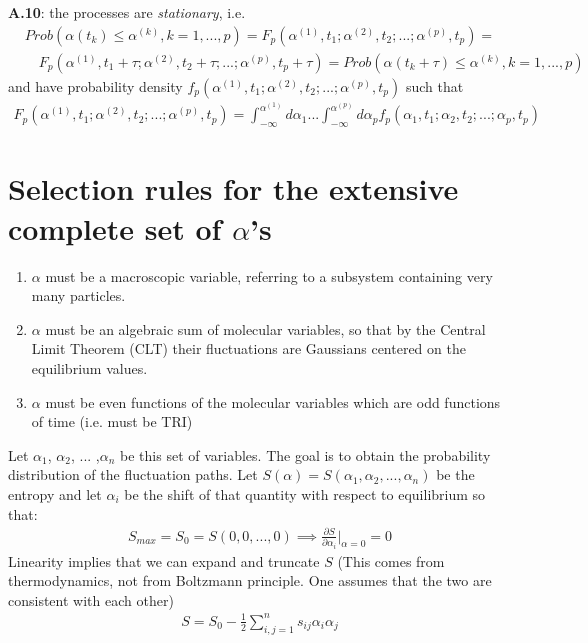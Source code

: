 \documentclass{article}
\begin{document}
\newline 
\textbf{A.10}: the processes are \textit{stationary}, i.e. 
\begin{align*}
&Prob(\alpha(t_k) \leq \alpha^{(k)}, k=1, ... , p) = F_p(\alpha^{(1)}, t_1 ;\alpha^{(2)}, t_2; ... ; \alpha^{(p)}, t_p) = \\&\quad
F_p(\alpha^{(1)}, t_1+ \tau ;\alpha^{(2)}, t_2+ \tau; ... ; \alpha^{(p)}, t_p + \tau) = Prob(\alpha(t_k + \tau) \leq \alpha^{(k)}, k=1, ... , p) 
\end{align*}
and have probability density $f_p(\alpha^{(1)}, t_1 ; \alpha^{(2)}, t_2; ... ; \alpha^{(p)}, t_p)$ such that
\begin{align*}
F_p(\alpha^{(1)}, t_1 ;\alpha^{(2)}, t_2; ... ; \alpha^{(p)}, t_p) = \int_{-\infty}^{\alpha^{(1)}}d\alpha_1 ...\int_{-\infty}^{\alpha^{(p)}}d\alpha_p f_p(\alpha_1, t_1 ; \alpha_2, t_2; ... ; \alpha_p, t_p)
\end{align*}

\section{Selection rules for the extensive complete set of $\alpha$'s}
 \begin{enumerate} 
 \item $\alpha$ must be a macroscopic variable, referring to a subsystem containing very many particles.
 \item $\alpha$ must be an algebraic sum of molecular variables, so that by the Central Limit Theorem (CLT) their fluctuations are Gaussians centered on the equilibrium values. 
 \item $\alpha$ must be even functions of the molecular variables which are odd functions of time (i.e. must be TRI)
 \end{enumerate}
Let $\alpha_1$, $\alpha_2$, ... ,$\alpha_n$ be this set of variables. The goal is to obtain the probability distribution of the fluctuation paths. 
Let $S(\alpha) = S(\alpha_1, \alpha_2, ... , \alpha_n)$ be the entropy and let $\alpha_i$ be the shift of that quantity with respect to equilibrium so that:
\begin{align*}
S_{max} = S_0 = S(0, 0, ..., 0) \implies \frac{\partial S}{\partial \alpha_i} \bigg\rvert_{\alpha = 0} = 0 
\end{align*}
Linearity implies that we can expand and truncate $S$ (This comes from thermodynamics, not from Boltzmann principle. One assumes that the two are consistent with each other)
\begin{align*}
S = S_0 - \frac{1}{2} \sum_{i,j = 1}^{n}s_{ij}\alpha_i \alpha_j
\end{align*}
\end{document}
